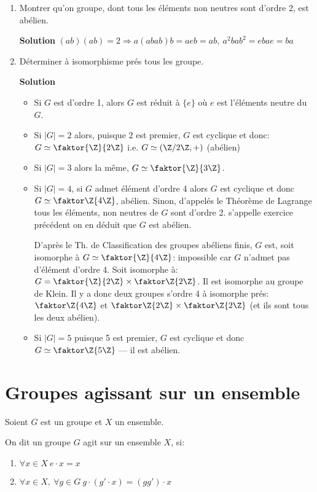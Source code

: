\begin{examplebox}
	\begin{enumerate}
		\item Montrer qu'on groupe, dont tous les éléments non neutres sont d'ordre 2, est abélien.
		
		\textbf{Solution} $(ab)(ab)=2 \Rightarrow a(abab)b=aeb=ab,\ a^2bab^2=ebae=ba$
		\item Déterminer à isomorphisme prés tous les groupe.
		
		\textbf{Solution} 
		\begin{itemize}
			\item Si $G$ est d'ordre 1, alors $G$ est réduit à $\{e\}$ où $e$ est l'éléments neutre du $G$.
			\item Si $|G|=2$ alors, puisque 2 est premier, $G$ est cyclique et donc: $G\simeq \faktor{\Z}{2\Z}$ i.e. $G\simeq (\Z/2\Z, +)$ (abélien)
			\item Si $|G|=3$ alors la même, $G\simeq \faktor{\Z}{3\Z}$.
			\item Si $|G|=4$, si $G$ admet élément d'ordre 4 alors $G$ est cyclique et donc $G\simeq \faktor\Z{4\Z}$, abélien. Sinon, d'appelés le Théorème de Lagrange tous les éléments, non neutres de $G$ sont d'ordre 2. s'appelle exercice précédent on en déduit que $G$ est abélien.
			
			D'après le Th. de Classification des groupes abéliens finis, $G$ est, soit isomorphe à $G\simeq \faktor{\Z}{4\Z}$: impossible car $G$ n'admet pas d'élément d'ordre 4. Soit isomorphe à: $G=\faktor{\Z}{2\Z}\times \faktor\Z{2\Z}$. Il est isomorphe au groupe de Klein. Il y a donc deux groupes s'ordre 4 à isomorphe prés: $\faktor\Z{4\Z}$ et $\faktor\Z{2\Z}\times\faktor\Z{2\Z}$ (et ils sont tous les deux abélien).
			\item Si $|G|=5$ puisque 5 est premier, $G$ est cyclique et donc $G \simeq \faktor\Z{5\Z}$ --- il est abélien.
		\end{itemize}
	\end{enumerate}
\end{examplebox}

\section{Groupes agissant sur un ensemble} %

Soient $G$ est un groupe et $X$ un ensemble.
\begin{definition}
	On dit un groupe $G$ agit sur un ensemble $X$, si:
	\begin{enumerate}
		\item $\forall x\in X\ e\cdot x= x$
		\item $\forall x\in X,\ \forall g\in G\ g\cdot(g'\cdot x)=(gg')\cdot x$
	\end{enumerate}
\end{definition}


